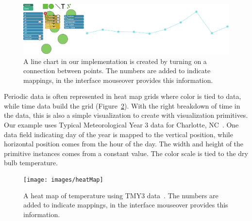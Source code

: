 \begin{figure}[t]
   \centering
   \includegraphics[width=\textwidth]{images/lineChart}
   \caption{
   A line chart in our implementation is created by turning on a connection between points.
   The numbers are added to indicate mappings, in the interface mouseover provides this information.
}
   \label{fig:lineChart}
\end{figure}

\label{heatMap}

Periodic data is often represented in heat map grids where color is tied to data, while time data build the grid (Figure~\ref{fig:heatMap}).
With the right breakdown of time in the data, this is also a simple visualization to create with visualization primitives.
Our example uses Typical Meteorological Year 3 data for Charlotte, NC~\cite{wilcox2008users}.
One data field indicating day of the year is mapped to the vertical position, while horizontal position comes from the hour of the day.
The width and height of the primitive instances comes from a constant value.
The color scale is tied to the dry bulb temperature.
\begin{figure}[t]
   \centering
   \texttt{[image: images/heatMap]}
   \caption{
   A heat map of temperature using TMY3 data~\cite{wilcox2008users}.
   The numbers are added to indicate mappings, in the interface mouseover provides this information.
}
   \label{fig:heatMap}
\end{figure}

\label{waterfallChart}

